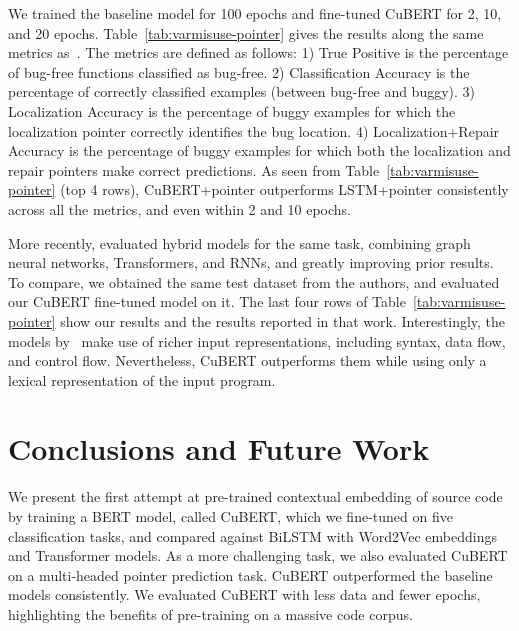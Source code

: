 \documentclass{article}
\newcommand{\BERTforCode}{CuBERT\xspace}
\newcommand{\update}[1]{#1}
\begin{document}
We trained the baseline model for \num{100} epochs and fine-tuned \BERTforCode for \num{2}, \num{10}, and \num{20} epochs. Table~\ref{tab:varmisuse-pointer} gives the results along the same metrics as~\citet{DBLP:journals/corr/abs-1904-01720}. The metrics are defined as follows: 1) True Positive is the percentage of bug-free functions classified as bug-free. 2) Classification Accuracy is the percentage of correctly classified examples (between bug-free and buggy). 3) Localization Accuracy is the percentage of buggy examples for which the localization pointer correctly identifies the bug location. 4) Localization+Repair Accuracy is the percentage of buggy examples for which both the localization and repair pointers make correct predictions. \update{As seen from Table~\ref{tab:varmisuse-pointer} (top 4 rows), \BERTforCode{}+pointer outperforms  LSTM+pointer consistently across all the metrics, and even within 2 and 10 epochs.}

More recently, \citet{hellendoorn2020global} evaluated hybrid models for the same task, combining graph neural networks, Transformers, and RNNs, and greatly improving prior results.
To compare, we obtained the same test dataset from the authors, and evaluated our \BERTforCode fine-tuned model on it. The last four rows of Table~\ref{tab:varmisuse-pointer} show our results and the results reported in that  work.
Interestingly, the models by~\citet{hellendoorn2020global} make use of richer input representations, including syntax, data flow, and control flow. \update{Nevertheless, \BERTforCode outperforms them while using only a lexical representation of the input program.}














\section{Conclusions {and Future Work}}

We present the first attempt at pre-trained contextual embedding of source code by training a BERT model, called \BERTforCode, which we fine-tuned on five {classification} tasks, and compared against BiLSTM with Word2Vec embeddings and Transformer models. {As a more challenging task, we also evaluated \BERTforCode on a multi-headed pointer prediction task.} \BERTforCode outperformed the baseline models consistently. We evaluated \BERTforCode with less data and fewer epochs, highlighting the benefits of pre-training on a massive code corpus. 
\end{document}
